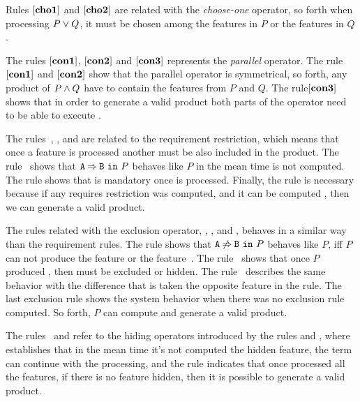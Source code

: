 Rules $\mathbf{[cho1]}$ and $\mathbf{[cho2]}$ 
are related with the \emph{choose-one} operator, so forth
when processing 
$P\mathbin{\lor} Q$, it must be chosen among the features in 
$P$ or the features in $Q$.

The rules  $\mathbf{[con1]}$,  $\mathbf{[con2]}$
and  $\mathbf{[con3]}$ 
represents the 
\emph{parallel} operator.
The rule $\mathbf{[con1]}$ and  $\mathbf{[con2]}$ show that the parallel operator is symmetrical, so forth,
any product of  $P\mathbin{\wedge} Q$
have to contain the features from  $P$ and $Q$. 
%
The rule$\mathbf{[con3]}$ shows that in order to generate a valid product
both parts of the operator need to be able to execute .

The rules~, ,
and  are related to the requirement
restriction, which means that once
a feature is processed another must be also 
included in the product.
The rule~ shows that
$\mathtt{A}\mathbin{\Rightarrow}\mathtt{B}\ \mathtt{in}\ P$ behaves like 
$P$ in the mean time  is not computed.
The rule  shows that 
is mandatory once  is processed.
Finally, the rule  is necessary 
because if any requires restriction was computed, 
and it can be computed ,
then we can generate a valid product.


The rules related with the exclusion operator, , , and ,
behaves in a similar way than the requirement rules.
The rule  shows that $\mathtt{A}\mathbin{\not\Rightarrow}\mathtt{B}\ \mathtt{in}\ P$
behaves like $P$, iff $P$ can not produce the  feature 
or the feature~.
The rule~ shows that once $P$
produced , then  must be excluded or hidden.
The rule~ describes the same behavior with the
difference that is taken the opposite feature in the rule. 
The last exclusion rule  shows the system behavior when
there was no exclusion rule computed. So forth, ${P}$ can compute
 and generate a valid product.

The rules~ and 
refer to the hiding operators introduced by the rules
 and , 
where~ establishes that in the mean time
it's not computed the hidden feature, the term can continue with
the processing, and the rule  indicates that
once processed all the features, if there is no feature hidden, then
it is possible to generate a valid product.

